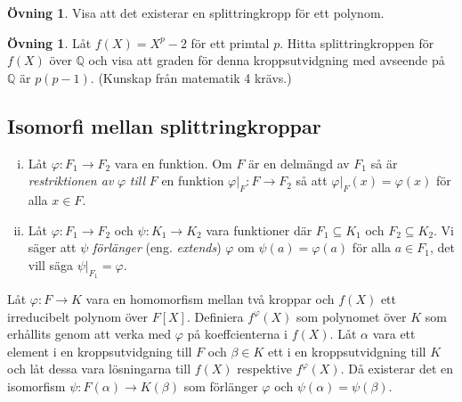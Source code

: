 \documentclass{article}
\theoremstyle{definition}
\newtheorem{ovning}[thm]{Övning}
\begin{document}
\begin{ovning}{5}
  Visa att det existerar en splittringkropp för ett polynom.
\end{ovning}

\begin{ovning}
  Låt $f(X) = X^p -2$ för ett primtal $p$. Hitta splittringkroppen för $f(X)$ över $\mathbb{Q}$ och visa att 
  graden för denna kroppsutvidgning med avseende på $\mathbb{Q}$ är $p(p-1)$. (Kunskap från matematik 4 krävs.)
\end{ovning}

\subsection{Isomorfi mellan splittringkroppar}
\begin{mydef}{}{}
  \begin{enumerate}[(i)]
    \item   Låt $\varphi: F_1 \rightarrow F_2$ vara en funktion. Om $F$ är en delmängd av $F_1$ så är \textit{restriktionen av} $\varphi$ \textit{till} $F$
    en funktion $\varphi|_F: F \rightarrow F_2$ så att $\varphi|_F(x) = \varphi(x)$ för alla $x \in F.$
    \item   Låt $\varphi: F_1 \rightarrow F_2$ och $\psi: K_1 \rightarrow K_2$ vara funktioner där $F_1 \subseteq K_1$
    och $F_2 \subseteq K_2$. 
    Vi säger att $\psi$ \textit{förlänger} (eng. \textit{extends})
    $\varphi$ om $\psi(a) = \varphi(a)$ för alla $a \in F_1$, det vill säga $\psi |_{F_1} = \varphi.$
  \end{enumerate}
\end{mydef}

\hypertarget{6.0.2}{}
\begin{mylemma}{}{}
  Låt $\varphi: F \rightarrow K$ vara en homomorfism mellan två kroppar och $f(X)$ ett irreducibelt polynom över $F[X]$. Definiera $f^{\varphi}(X)$
  som polynomet över $K$ som erhållits genom att verka med $\varphi$ på koeffcienterna i $f(X)$. Låt $\alpha$ vara ett element i en kroppsutvidgning till $F$
  och $\beta \in K$ ett i en kroppsutvidgning till $K$ och låt dessa vara lösningarna till
  $f(X)$ respektive $f^{\varphi}(X)$. Då existerar det en isomorfism $\psi:F(\alpha) \rightarrow K(\beta)$ 
  som förlänger $\varphi$ och $\psi(\alpha) = \psi(\beta).$
\end{mylemma}
\end{document}
